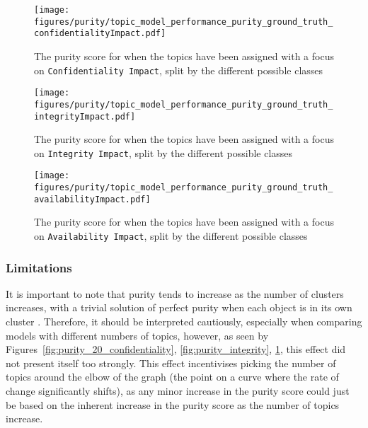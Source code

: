 \begin{figure}[t]
	\begin{center}
		\begin{minipage}[t]{0.45\textwidth}
			\texttt{[image: figures/purity/topic\_model\_performance\_purity\_ground\_truth\_confidentialityImpact.pdf]}
			\caption{The purity score for when the topics have been assigned with a focus on \texttt{Confidentiality Impact}, split by the different possible classes}
			\label{fig:purity_20_confidentiality}
		\end{minipage}

		\vspace{2mm}

		\begin{minipage}[t]{0.45\textwidth}
			\texttt{[image: figures/purity/topic\_model\_performance\_purity\_ground\_truth\_integrityImpact.pdf]}
			\caption{The purity score for when the topics have been assigned with a focus on \texttt{Integrity Impact}, split by the different possible classes}
			\label{fig:purity_integrity}
		\end{minipage}

		\vspace{2mm}

		\begin{minipage}[t]{0.45\textwidth}
			\texttt{[image: figures/purity/topic\_model\_performance\_purity\_ground\_truth\_availabilityImpact.pdf]}
			\caption{The purity score for when the topics have been assigned with a focus on \texttt{Availability Impact}, split by the different possible classes}
			\label{fig:purity_20_availability}
		\end{minipage}
	\end{center}
\end{figure}

\subsubsection{Limitations}

It is important to note that purity tends to increase as the number of clusters increases, with a trivial solution of perfect purity when each object is in its own cluster \cite{v-measure}. Therefore, it should be interpreted cautiously, especially when comparing models with different numbers of topics, however, as seen by Figures~\ref{fig:purity_20_confidentiality}, \ref{fig:purity_integrity}, \ref{fig:purity_20_availability}, this effect did not present itself too strongly. This effect incentivises picking the number of topics around the elbow of the graph (the point on a curve where the rate of change significantly shifts), as any minor increase in the purity score could just be based on the inherent increase in the purity score as the number of topics increase.


